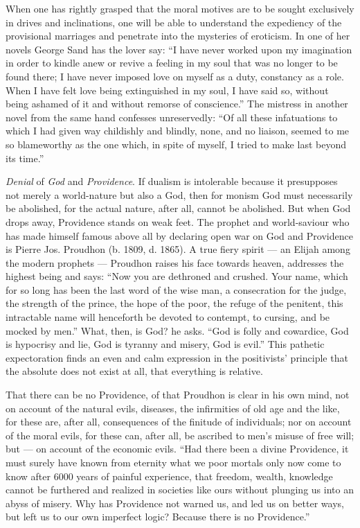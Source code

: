 \documentclass[12pt,a4paper,openany]{book}
\newcommand{\opage}[1]{\marginnote{\footnotesize\textit{[#1]}}}
\begin{document}
When one has rightly grasped that the moral motives
are to be sought exclusively in drives and inclinations,
one will be able to understand the expediency
of the provisional marriages and penetrate into the mysteries
of eroticism. In one of her novels George Sand
has the lover say: ``I have never worked upon my imagination
in order to kindle anew or revive a
feeling in my soul that was no longer to be found there; I have
never imposed love on myself as a duty, constancy
as a role. When I have felt love being extinguished
in my soul, I have said so, without being ashamed
of it and without remorse of conscience.'' The mistress in
another novel from the same hand confesses unreservedly:
``Of all these infatuations to which I had given way childishly and blindly,
none, and no liaison, seemed to
me so blameworthy as the one which, in spite of myself,
I tried to make last beyond its time.''

\emph{Denial} of \emph{God} and \emph{Providence}. If dualism
is intolerable because it presupposes not merely a world-nature
but also a God, then for monism God must
\setcounter{footnote}{0}%
\opage{84}necessarily be abolished, for the actual nature, after all,
cannot be abolished. But when God drops away,
Providence stands on weak feet. The prophet and
world-saviour who has made himself famous above all by declaring
open war on God and Providence is Pierre
Jos. Proudhon (b. 1809, d. 1865). A true fiery spirit ---
an Elijah among the modern prophets --- Proudhon
raises his face towards heaven, addresses the highest
being and says: ``Now you are dethroned and crushed.
Your name, which for so long has been the last word of the wise man,
a consecration for the judge, the strength of the prince, the
hope of the poor, the refuge of the penitent, this intractable
name will henceforth be devoted to contempt, to cursing,
and be mocked by men.'' What, then, is
God? he asks. ``God is folly and cowardice, God
is hypocrisy and lie, God is tyranny and misery,
God is evil.'' This pathetic expectoration
finds an even and calm expression in the positivists' principle
that the absolute does not exist at all, that everything is relative.

That there can be no Providence, of that
Proudhon is clear in his own mind, not on account
of the natural evils, diseases, the infirmities of old age
and the like, for these are, after all, consequences of the finitude
of individuals; nor on account of the moral
evils, for these can, after all, be ascribed to men's misuse
of free will; but --- on account of the economic
evils. ``Had there been a divine Providence,
it must surely have known from eternity what we
poor mortals only now come to know after 6000 years of painful experience,
that freedom, wealth, knowledge
cannot be furthered and realized in societies like ours
without plunging us into an abyss of misery.
\setcounter{footnote}{0}%
\opage{85}Why has Providence not warned us, and led us on better
ways, but left us to our own imperfect logic?
Because there is no Providence.''
\end{document}
